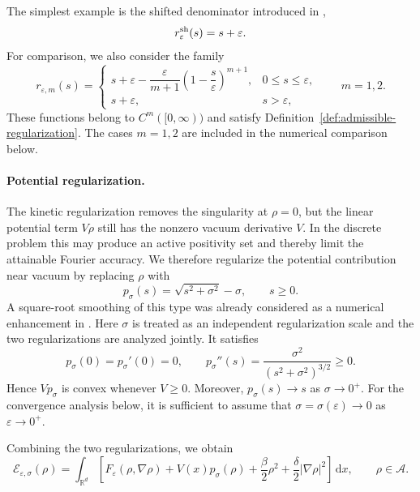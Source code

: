 \documentclass[11pt]{article}
\newcommand{\R}{\mathbb{R}}
\newcommand{\A}{\mathcal{A}}
\newcommand{\E}{\mathcal{E}}
\newcommand{\dd}{\,\mathrm{d}}
\newcommand{\eps}{\varepsilon}
\newcommand{\sig}{\sigma}
\theoremstyle{plain}
\theoremstyle{definition}
\numberwithin{equation}{section}
\begin{document}
The simplest example is the shifted denominator introduced in
\cite{BaoRuan2019},
\begin{equation}
\label{eq:shift-denominator}
r_\eps^{\rm sh}(s)=s+\eps.
\end{equation}
For comparison, we also consider the family
\begin{equation}
\label{eq:piecewise-regularization-family}
r_{\eps,m}(s)
=
\begin{cases}
s+\eps-\dfrac{\eps}{m+1}
\left(1-\dfrac{s}{\eps}\right)^{m+1},
&0\le s\le\eps,\\[2ex]
s+\eps,
&s>\eps,
\end{cases}
\qquad m=1,2.
\end{equation}
These functions belong to $C^m([0,\infty))$ and satisfy
Definition~\ref{def:admissible-regularization}. The cases $m=1,2$
are included in the numerical comparison below.

\paragraph{Potential regularization.}

The kinetic regularization removes the singularity at $\rho=0$, but
the linear potential term $V\rho$ still has the nonzero vacuum
derivative $V$. In the discrete problem this may produce an active
positivity set and thereby limit the attainable Fourier accuracy.
We therefore regularize the potential contribution near vacuum by
replacing $\rho$ with
\begin{equation}
\label{eq:potential-regularizer}
p_\sig(s)
=
\sqrt{s^2+\sig^2}-\sig,
\qquad s\ge0.
\end{equation}
A square-root smoothing of this type was already considered as a
numerical enhancement in \cite{BaoRuan2019}. Here $\sig$ is treated as
an independent regularization scale and the two regularizations are
analyzed jointly.
It satisfies
\begin{equation}
\label{eq:potential-regularizer-derivatives}
p_\sig(0)=p_\sig'(0)=0,
\qquad
p_\sig''(s)
=
\frac{\sig^2}{(s^2+\sig^2)^{3/2}}
\ge0.
\end{equation}
Hence $Vp_\sig$ is convex whenever $V\ge0$. Moreover,
$p_\sig(s)\to s$ as $\sig\to0^+$. For the convergence analysis below,
it is sufficient to assume that
$\sig=\sig(\eps)\to0$ as $\eps\to0^+$.

Combining the two regularizations, we obtain
\begin{equation}
\label{eq:joint-regularized-energy}
\E_{\eps,\sig}(\rho)
=
\int_{\R^d}
\left[
F_\eps(\rho,\nabla\rho)
+V(x)p_\sig(\rho)
+\frac{\beta}{2}\rho^2
+\frac{\delta}{2}|\nabla\rho|^2
\right]\dd x,
\qquad
\rho\in\A.
\end{equation}
\end{document}

